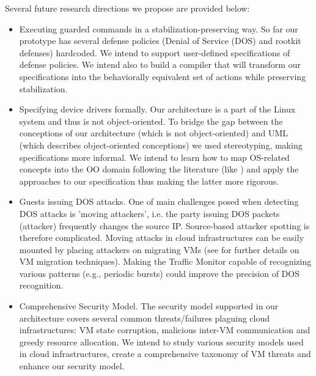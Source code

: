 Several future research directions we propose are provided below: 
\begin{itemize}
\item Executing guarded commands in a stabilization-preserving way. So far
our prototype has several defense policies (Denial of Service (DOS)
and rootkit defenses) hardcoded. We intend to support user-defined
specifications of defense policies. We intend also to build a compiler
that will transform our specifications into the behaviorally equivalent
set of actions while preserving stabilization.
\item Specifying device drivers formally. Our architecture is a part of
the Linux system and thus is not object-oriented. To bridge the gap
between the conceptions of our architecture (which is not object-oriented)
and UML (which describes object-oriented conceptions) we used stereotyping,
making specifications more informal. We intend to learn how to map
OS-related concepts into the OO domain following the literature (like
\cite{sertic-rus-rac:uml-realtime:2003}) and apply the approaches
to our specification thus making the latter more rigorous. 
\item Guests issuing DOS attacks. One of main challenges posed when detecting
DOS attacks is 'moving attackers', i.e. the party issuing DOS packets
(attacker) frequently changes the source IP. Source-based attacker
spotting is therefore complicated. Moving attacks in cloud infrastructures
can be easily mounted by placing attackers on migrating VMs (see \cite{key:article}
for further details on VM migration techniques). Making the Traffic
Monitor capable of recognizing various patterns (e.g., periodic bursts)
could improve the precision of DOS recognition. 
\item Comprehensive Security Model. The security model supported in our
architecture covers several common threats/failures plaguing cloud
infrastructures: VM state corruption, malicious inter-VM communication
and greedy resource allocation. We intend to study various security
models used in cloud infrastructures, create a comprehensive taxonomy
of VM threats and enhance our security model. \end{itemize}


